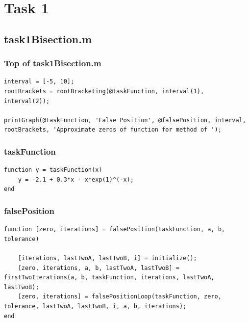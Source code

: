 \section{Task 1}

\subsection{task1Bisection.m}

\subsubsection{Top of task1Bisection.m}
\begin{simplechar}
\begin{lstlisting}
interval = [-5, 10];
rootBrackets = rootBracketing(@taskFunction, interval(1), interval(2));

printGraph(@taskFunction, 'False Position', @falsePosition, interval, rootBrackets, 'Approximate zeros of function for method of ');
\end{lstlisting}
\end{simplechar}

\subsubsection{taskFunction}
\begin{simplechar}
\begin{lstlisting}
function y = taskFunction(x)
    y = -2.1 + 0.3*x - x*exp(1)^(-x);
end
\end{lstlisting}
\end{simplechar}

\newpage
\subsubsection{falsePosition}
\begin{simplechar}
\begin{lstlisting}
function [zero, iterations] = falsePosition(taskFunction, a, b, tolerance)

    [iterations, lastTwoA, lastTwoB, i] = initialize();
    [zero, iterations, a, b, lastTwoA, lastTwoB] = firstTwoIterations(a, b, taskFunction, iterations, lastTwoA, lastTwoB);
    [zero, iterations] = falsePositionLoop(taskFunction, zero, tolerance, lastTwoA, lastTwoB, i, a, b, iterations);
end
\end{lstlisting}
\end{simplechar}


